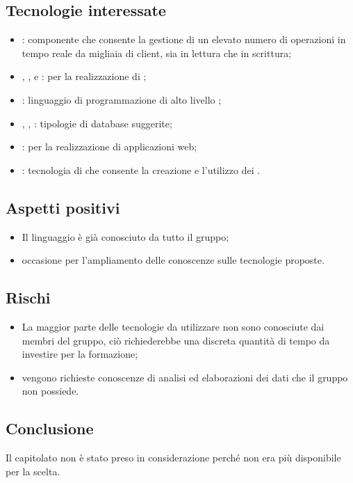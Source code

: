 \documentclass[../studio-di-fattibilita.tex]{subfiles}
\begin{document}
\subsection{Tecnologie interessate}%
\label{sub:tecnologie_interessate}
\begin{itemize}
    \item {}: componente che consente la gestione di un elevato numero di operazioni in tempo reale da migliaia di client, sia in lettura che in scrittura;
    \item {}, ,  e :  per la realizzazione di ;
    \item {}: linguaggio di programmazione di alto livello ;
    \item {}, , : tipologie di database suggerite;
    \item {}:  per la realizzazione di applicazioni web;
    \item {}: tecnologia di  che consente la creazione e l'utilizzo dei .
\end{itemize}

\subsection{Aspetti positivi}%
\label{sub:aspetti_positivi}
\begin{itemize}
    \item Il linguaggio  è già conosciuto da tutto il gruppo;
    \item occasione per l'ampliamento delle conoscenze sulle tecnologie proposte.
\end{itemize}

\subsection{Rischi}%
\begin{itemize}
    \item La maggior parte delle tecnologie da utilizzare non sono conosciute dai membri del gruppo, ciò richiederebbe una discreta quantità di tempo da investire per la formazione;
    \item vengono richieste conoscenze di analisi ed elaborazioni dei dati che il gruppo non possiede.
\end{itemize}


\label{sub:rischi}


\subsection{Conclusione}%
\label{sub:conclusione}
Il capitolato non è stato preso in considerazione perché non era più disponibile per la scelta.
\end{document}
